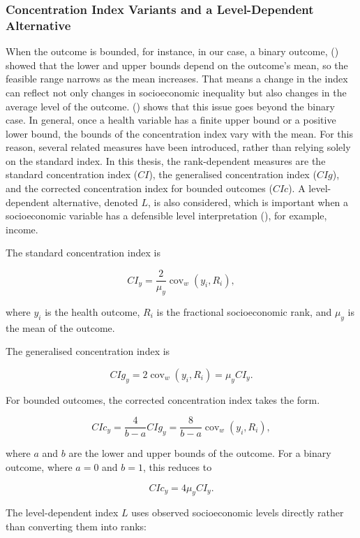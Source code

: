 \documentclass[
  11pt,
  a4paper,
]{article}
\begin{document}
\subsubsection{Concentration Index Variants and a Level-Dependent
Alternative}\label{sec-ci-extensions}

When the outcome is bounded, for instance, in our case, a binary
outcome, () showed that
the lower and upper bounds depend on the outcome's mean, so the feasible
range narrows as the mean increases. That means a change in the index
can reflect not only changes in socioeconomic inequality but also
changes in the average level of the outcome.
() shows that
this issue goes beyond the binary case. In general, once a health
variable has a finite upper bound or a positive lower bound, the bounds
of the concentration index vary with the mean. For this reason, several
related measures have been introduced, rather than relying solely on the
standard index. In this thesis, the rank-dependent measures are the
standard concentration index (\(CI\)), the generalised concentration
index (\(CIg\)), and the corrected concentration index for bounded
outcomes (\(CIc\)). A level-dependent alternative, denoted \(L\), is
also considered, which is important when a socioeconomic variable has a
defensible level interpretation
(), for example, income.

The standard concentration index is

\[
CI_y = \frac{2}{\mu_y}\operatorname{cov}_w(y_i, R_i),
\]

where \(y_i\) is the health outcome, \(R_i\) is the fractional
socioeconomic rank, and \(\mu_y\) is the mean of the outcome.

The generalised concentration index is

\[
CIg_y = 2\operatorname{cov}_w(y_i, R_i) = \mu_y CI_y.
\]

For bounded outcomes, the corrected concentration index takes the form.

\[
CIc_y = \frac{4}{b-a}CIg_y
= \frac{8}{b-a}\operatorname{cov}_w(y_i, R_i),
\]

where \(a\) and \(b\) are the lower and upper bounds of the outcome. For
a binary outcome, where \(a=0\) and \(b=1\), this reduces to

\[
CIc_y = 4\mu_y CI_y.
\]

The level-dependent index \(L\) uses observed socioeconomic levels
directly rather than converting them into ranks:
\end{document}
